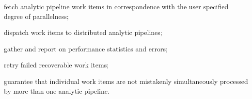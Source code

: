 \begin{description}
  \item fetch analytic pipeline work items in correspondence with the user specified degree of parallelness;
  \item dispatch work items to distributed analytic pipelines;
  \item gather and report on performance statistics and errors;
  \item retry failed recoverable work items;
  \item guarantee that individual work items are not mistakenly simultaneously processed by more than one analytic pipeline.
\end{description}